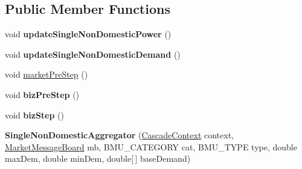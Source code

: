 \subsection*{Public Member Functions}
\begin{DoxyCompactItemize}
\item 
\hypertarget{classuk_1_1ac_1_1dmu_1_1iesd_1_1cascade_1_1agents_1_1aggregators_1_1_single_non_domestic_aggregator_a34d3ae8fdd504c9b78fef1af61dd60c9}{void {\bfseries update\-Single\-Non\-Domestic\-Power} ()}\label{classuk_1_1ac_1_1dmu_1_1iesd_1_1cascade_1_1agents_1_1aggregators_1_1_single_non_domestic_aggregator_a34d3ae8fdd504c9b78fef1af61dd60c9}

\item 
\hypertarget{classuk_1_1ac_1_1dmu_1_1iesd_1_1cascade_1_1agents_1_1aggregators_1_1_single_non_domestic_aggregator_a0990f6e7322d8486b7b5a8fb3191a313}{void {\bfseries update\-Single\-Non\-Domestic\-Demand} ()}\label{classuk_1_1ac_1_1dmu_1_1iesd_1_1cascade_1_1agents_1_1aggregators_1_1_single_non_domestic_aggregator_a0990f6e7322d8486b7b5a8fb3191a313}

\item 
void \hyperlink{classuk_1_1ac_1_1dmu_1_1iesd_1_1cascade_1_1agents_1_1aggregators_1_1_single_non_domestic_aggregator_a12a2c5f513e2a4a79adebe24dabb3e16}{market\-Pre\-Step} ()
\item 
\hypertarget{classuk_1_1ac_1_1dmu_1_1iesd_1_1cascade_1_1agents_1_1aggregators_1_1_single_non_domestic_aggregator_afb435594c218e4d75a66ebc6a2028dbb}{void {\bfseries biz\-Pre\-Step} ()}\label{classuk_1_1ac_1_1dmu_1_1iesd_1_1cascade_1_1agents_1_1aggregators_1_1_single_non_domestic_aggregator_afb435594c218e4d75a66ebc6a2028dbb}

\item 
\hypertarget{classuk_1_1ac_1_1dmu_1_1iesd_1_1cascade_1_1agents_1_1aggregators_1_1_single_non_domestic_aggregator_af3664d0afa4936ce5e2b64e044a24d76}{void {\bfseries biz\-Step} ()}\label{classuk_1_1ac_1_1dmu_1_1iesd_1_1cascade_1_1agents_1_1aggregators_1_1_single_non_domestic_aggregator_af3664d0afa4936ce5e2b64e044a24d76}

\item 
\hypertarget{classuk_1_1ac_1_1dmu_1_1iesd_1_1cascade_1_1agents_1_1aggregators_1_1_single_non_domestic_aggregator_a88bbf5a48dfa97a456f2f27ffe864da5}{{\bfseries Single\-Non\-Domestic\-Aggregator} (\hyperlink{classuk_1_1ac_1_1dmu_1_1iesd_1_1cascade_1_1context_1_1_cascade_context}{Cascade\-Context} context, \hyperlink{classuk_1_1ac_1_1dmu_1_1iesd_1_1cascade_1_1market_1_1astem_1_1operators_1_1_market_message_board}{Market\-Message\-Board} mb, B\-M\-U\-\_\-\-C\-A\-T\-E\-G\-O\-R\-Y cat, B\-M\-U\-\_\-\-T\-Y\-P\-E type, double max\-Dem, double min\-Dem, double\mbox{[}$\,$\mbox{]} base\-Demand)}\label{classuk_1_1ac_1_1dmu_1_1iesd_1_1cascade_1_1agents_1_1aggregators_1_1_single_non_domestic_aggregator_a88bbf5a48dfa97a456f2f27ffe864da5}

\end{DoxyCompactItemize}
